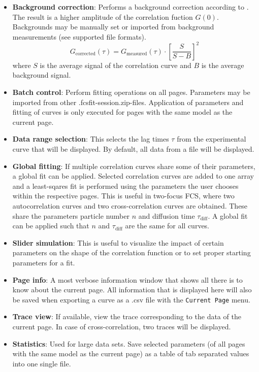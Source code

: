 \begin{itemize}
\item \textbf{Background correction}: Performs a background correction according to \cite{Thomps:bookFCS2002}. The result is a higher amplitude of the correlation fuction $G(0)$. Backgrounds may be manually set or imported from background measurements (see supported file formats).
\begin{equation}
G_\mathrm{corrected}(\tau) = G_\mathrm{measured}(\tau) \cdot \left[ \frac{S}{S-B} \right]^2
\label{eq:BG_correction}
\end{equation}
where $S$ is the average signal of the correlation curve and $B$ is the average background signal.
\item \textbf{Batch control}: Perform fitting operations on all pages. Parameters may be imported from other \mytilde .fcsfit-session.zip-files. Application of parameters and fitting of curves is only executed for pages with the same model as the current page.
\item \textbf{Data range selection}: This selects the lag times $\tau$ from the experimental curve that will be displayed. By default, all data from a file will be displayed. 
\item \textbf{Global fitting}: If multiple correlation curves share some of their parameters, a global fit can be applied. Selected correlation curves are added to one array and a least-sqares fit is performed using the parameters the user chooses within the respective pages. This is useful in two-focus FCS, where two autocorrelation curves and two cross-correlation curves are obtained. These share the parameters particle number $n$ and diffusion time $\tau_{\text{diff}}$. A global fit can be applied such that $n$ and $\tau_{\text{diff}}$ are the same for all curves.
\item \textbf{Slider simulation}: This is useful to visualize the impact of certain parameters on the shape of the correlation function or to set proper starting parameters for a fit.
\item \textbf{Page info}: A most verbose information window that shows all there is to know about the current page. All information that is displayed here will also be saved when exporting a curve as a \mytilde .csv file with the \texttt{Current Page} menu.
\item \textbf{Trace view}: If available, view the trace corresponding to the data of the current page. In case of cross-correlation, two traces will be displayed.
\item  \textbf{Statistics}: Used for large data sets. Save selected parameters (of all pages with the same model as the current page) as a table of tab separated values into one single file.
\end{itemize}
